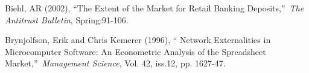 \documentclass[aps,pra,notitlepage,amsmath,amssymb,letterpaper,12pt]{revtex4-1}
\begin{document}
\begin{thebibliography}
\bibitem{[1]} Biehl, AR (2002), \textquotedblleft The Extent of the Market for
Retail Banking Deposits,\textquotedblright\ \textit{The Antitrust Bulletin},
Spring:91-106.


\bibitem{[2]} Brynjolfson, Erik and Chris Kemerer (1996), \textquotedblleft
Network Externalities in Microcomputer Software: An Econometric Analysis of
the Spreadsheet Market,\textquotedblright\ \textit{Management Science}, Vol.
42, iss.12, pp. 1627-47.

\end{thebibliography}
 
 
\end{document}
